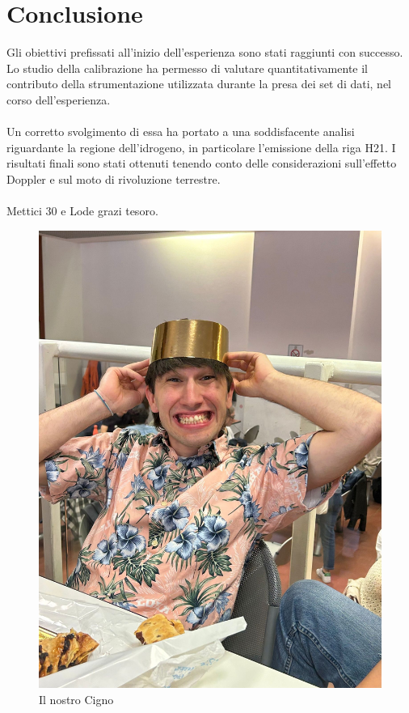 \section{Conclusione}

Gli obiettivi prefissati all'inizio dell'esperienza sono stati raggiunti con successo. Lo studio della calibrazione ha permesso di valutare quantitativamente il contributo della strumentazione utilizzata durante la presa dei set di dati, nel corso dell'esperienza.
\\\\
Un corretto svolgimento di essa ha portato a una soddisfacente analisi  riguardante la regione dell'idrogeno, in particolare l'emissione della riga H21.
I risultati finali sono stati ottenuti tenendo conto delle considerazioni sull'effetto Doppler e sul moto di rivoluzione terrestre.
\\\\
Mettici 30 e Lode grazi tesoro.

\begin{figure}[H]
	\centering
	\includegraphics[scale=0.25]{Simo.jpeg}
	\caption{Il nostro Cigno}
    	\label{fig:Mappa_finale}
\end{figure}
